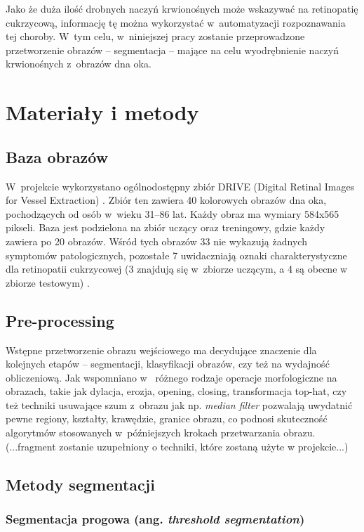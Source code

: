 \documentclass[conference]{IEEEtran}
\begin{document}
Jako że duża ilość drobnych naczyń krwionośnych może wskazywać na retinopatię cukrzycową, informację tę można wykorzystać w~automatyzacji rozpoznawania tej choroby. W~tym celu, w~niniejszej pracy zostanie przeprowadzone przetworzenie obrazów -- segmentacja -- mające na celu wyodrębnienie naczyń krwionośnych z~obrazów dna oka.

\section{Materiały i metody}
\subsection{Baza obrazów}
W~projekcie wykorzystano ogólnodostępny zbiór DRIVE (Digital Retinal Images for Vessel Extraction) \cite{b6}. Zbiór ten zawiera 40 kolorowych obrazów dna oka, pochodzących od osób w~wieku 31--86 lat. Każdy obraz ma wymiary 584x565 pikseli. Baza jest podzielona na zbiór uczący oraz treningowy, gdzie każdy zawiera po 20 obrazów. Wśród tych obrazów 33 nie wykazują żadnych symptomów patologicznych, pozostałe 7 uwidaczniają oznaki charakterystyczne dla retinopatii cukrzycowej (3 znajdują się w~zbiorze uczącym, a 4 są obecne w zbiorze testowym) \cite{b4}.
\subsection{Pre-processing}
Wstępne przetworzenie obrazu wejściowego ma decydujące znaczenie dla kolejnych etapów -- segmentacji, klasyfikacji obrazów, czy też na wydajność obliczeniową. Jak wspomniano w~\cite{b5} różnego rodzaje operacje morfologiczne na obrazach, takie jak dylacja, erozja, opening, closing, transformacja top-hat, czy też techniki usuwające szum z~obrazu jak np. \textit{median filter} pozwalają uwydatnić pewne regiony, kształty, krawędzie, granice obrazu, co podnosi skuteczność algorytmów stosowanych w~późniejszych krokach przetwarzania obrazu. 
(...fragment zostanie uzupełniony o techniki, które zostaną użyte w projekcie...)

\subsection{Metody segmentacji}
\subsubsection{Segmentacja progowa (ang. \textit{threshold segmentation})}
\end{document}
